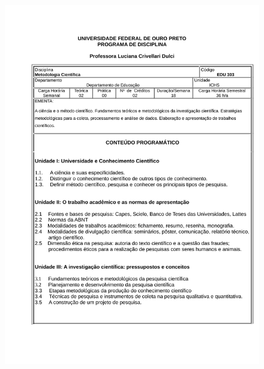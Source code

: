 \begin{figure}[p]
	\centering 
	\includegraphics[scale=0.7]{capitulos/anexo1-programas-disciplina/p56.pdf}
\end{figure}

